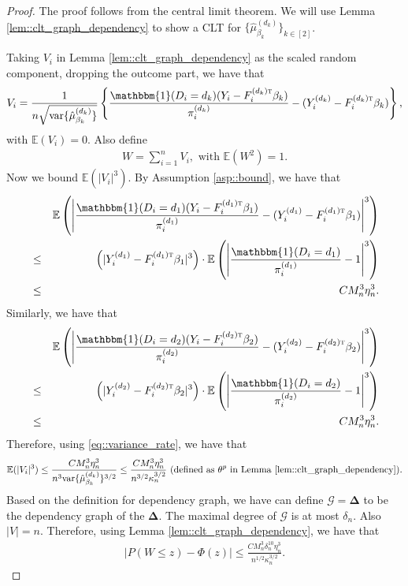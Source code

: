 \documentclass[twoside]{article}
\theoremstyle{plain}
\theoremstyle{definition}
\theoremstyle{remark}
\newcommand{\E}{\mathbb{E}}
\def\T{{\textsc{t}}}
\newcommand{\var}{\textup{var}}
\newcommand{\bDelta}{\boldsymbol{\Delta}}
\newcommand{\indicator}{\mathbbm{1}}
\newcommand{\cG}{\mathcal{G}}
\newcommand{\sumi}{\sum_{i=1}^n}
\begin{document}
\begin{proof}
    The proof follows from the central limit theorem. We will use Lemma \ref{lem::clt_graph_dependency} to show a CLT for $\{\hat\mu^{(d_k)}_{\beta_k}\}_{k\in[2]}$.

    Taking $V_i$ in Lemma \ref{lem::clt_graph_dependency} as the scaled random component, dropping the outcome part, we have that
    \begin{eqnarray*}
        V_i = \frac{1}{n\sqrt{\var\{\hat\mu^{(d_k)}_{\beta_k}\}}} \left\{\frac{\indicator(D_i=d_k)(Y_i - F_i^{(d_k)\T} \beta_k)}{\pi_i^{(d_k) } } - (Y_i^{(d_k)} - F_i^{(d_k)\T} \beta_k)\right\},
    \end{eqnarray*}
    with $\E(V_i) = 0$. Also define
    \begin{eqnarray*}
        W = \sumi V_i, \text{ with } \E(W^2) = 1.
    \end{eqnarray*}
    Now we bound $\E(|V_i|^3)$. By Assumption \ref{asp::bound}, we have that
    \begin{eqnarray*}
        &&\E\left(\left|\frac{\indicator(D_i=d_1)(Y_i - F_i^{(d_1)\T} \beta_1)}{\pi_i^{(d_1) } } - (Y_i^{(d_1)} - F_i^{(d_1)\T} \beta_1)\right|^3\right) \\
        &\le& \left(|Y_i^{(d_1)} - F_i^{(d_1)\T} \beta_1|^3\right) \cdot \E\left(\left|\frac{\indicator(D_i=d_1)}{\pi_i^{(d_1)}} - 1\right|^3\right) \\
        &\le& C M_n^3 \eta_n^3.
    \end{eqnarray*}
    Similarly, we have that
    \begin{eqnarray*}
        &&\E\left(\left|\frac{\indicator(D_i=d_2)(Y_i - F_i^{(d_2)\T} \beta_2)}{\pi_i^{(d_2) } } - (Y_i^{(d_2)} - F_i^{(d_2)\T} \beta_2)\right|^3\right) \\
        &\le& \left(|Y_i^{(d_2)} - F_i^{(d_2)\T} \beta_2|^3\right) \cdot \E\left(\left|\frac{\indicator(D_i=d_2)}{\pi_i^{(d_2)}} - 1\right|^3\right) \\
        &\le& C M_n^3 \eta_n^3.
    \end{eqnarray*}
    Therefore, using \eqref{eq::variance_rate}, we have that
    \begin{eqnarray*}
        \E(|V_i|^3) \leq \frac{C M_n^3 \eta_n^3}{n^3 \var\{\hat\mu^{(d_k)}_{\beta_k}\}^{3/2}} \leq \frac{C M_n^3 \eta_n^3}{n^{3/2} \kappa_n^{3/2} } \text{ (defined as $\theta^p$ in Lemma \ref{lem::clt_graph_dependency})}.
    \end{eqnarray*}
    Based on the definition for dependency graph, we have can define $\cG = \bDelta$ to be the dependency graph of the $\bDelta$. The maximal degree of $\cG$ is at most $\delta_n$. Also $|V| = n$. Therefore, using Lemma \ref{lem::clt_graph_dependency}, we have that
    \begin{eqnarray*}
        |P(W \leq z) - \Phi(z)| \leq \frac{C M_n^3 \delta_n^{10} \eta_n^3}{n^{1/2} \kappa_n^{3/2} }.
    \end{eqnarray*}
\end{proof}
\end{document}
